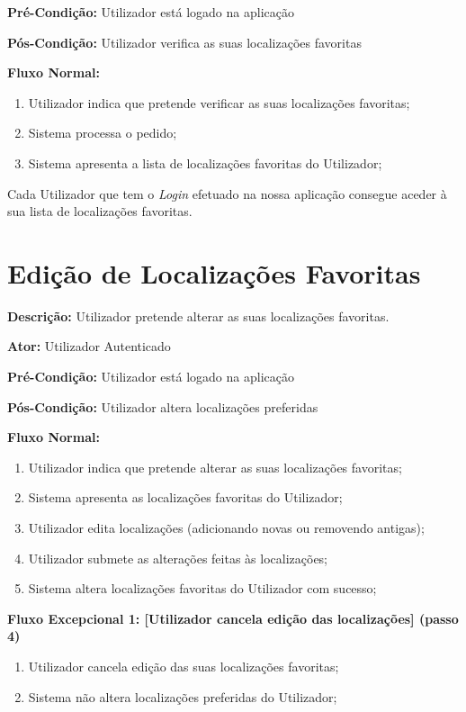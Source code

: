 \documentclass[a4paper,12pt]{scrreprt}
\newcommand{\tab}{
    \hspace{1cm}}
\begin{document}
\textbf{Pré-Condição: }Utilizador está logado na aplicação

\textbf{Pós-Condição: }Utilizador verifica as suas localizações favoritas

\textbf{Fluxo Normal: }
\begin{enumerate}
    \item Utilizador indica que pretende verificar as suas localizações favoritas;
    \item Sistema processa o pedido;
    \item Sistema apresenta a lista de localizações favoritas do Utilizador;
\end{enumerate}

\vspace{1.5cm}

\tab Cada Utilizador que tem o \textit{Login} efetuado na nossa aplicação consegue aceder à sua lista de localizações favoritas.

\clearpage

\section{Edição de Localizações Favoritas}

\textbf{Descrição: }Utilizador pretende alterar as suas localizações favoritas.

\textbf{Ator: }Utilizador Autenticado

\textbf{Pré-Condição: }Utilizador está logado na aplicação

\textbf{Pós-Condição: }Utilizador altera localizações preferidas

\textbf{Fluxo Normal: }
\begin{enumerate}
    \item Utilizador indica que pretende alterar as suas localizações favoritas;
    \item Sistema apresenta as localizações favoritas do Utilizador;
    \item Utilizador edita localizações (adicionando novas ou removendo antigas);
    \item Utilizador submete as alterações feitas às localizações;
    \item Sistema altera localizações favoritas do Utilizador com sucesso;
\end{enumerate}

\textbf{Fluxo Excepcional 1: [Utilizador cancela edição das localizações] (passo 4)}
\begin{enumerate}[label=4.\arabic*]
    \item Utilizador cancela edição das suas localizações favoritas;
    \item Sistema não altera localizações preferidas do Utilizador;
\end{enumerate}
\end{document}
